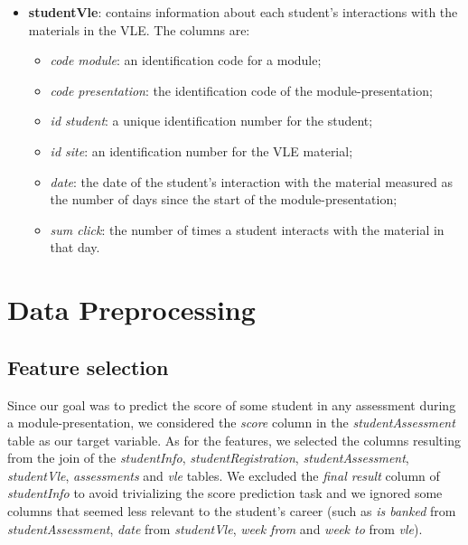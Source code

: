 \documentclass{article}
\begin{document}
\begin{itemize}
    \item \textbf{studentVle}: contains information about each student’s interactions with the materials in the VLE. The columns are:
    \begin{itemize}
        \item \textit{code module}: an identification code for a module;
        \item \textit{code presentation}: the identification code of the module-presentation;
        \item \textit{id student}: a unique identification number for the student;
        \item \textit{id site}: an identification number for the VLE material;
        \item \textit{date}: the date of the student’s interaction with the material measured as the number of days since the start of the module-presentation;
        \item \textit{sum click}: the number of times a student interacts with the material in that day.
    \end{itemize}

    \end{itemize}


\section{Data Preprocessing}

\subsection{Feature selection}

Since our goal was to predict the score of some student in any assessment during a module-presentation, we considered the \textit{score} column in the \textit{studentAssessment} table as our target variable. As for the features, we selected the columns resulting from the join of the \textit{studentInfo}, \textit{studentRegistration}, \textit{studentAssessment}, \textit{studentVle}, \textit{assessments} and \textit{vle} tables. We excluded the \textit{final result} column of \textit{studentInfo} to avoid trivializing the score prediction task and we ignored some columns that seemed less relevant to the student's career (such as \textit{is banked} from \textit{studentAssessment}, \textit{date} from \textit{studentVle}, \textit{week from} and \textit{week to} from \textit{vle}).\\ 
\end{document}
